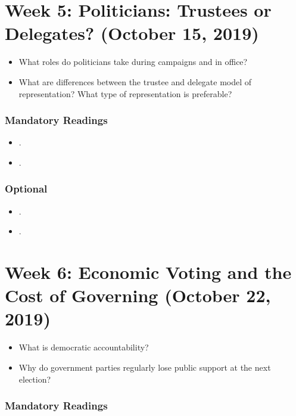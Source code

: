 \documentclass[abstract=on,parskip=full,headings=standardclasses,fontsize=11pt,paper=a4]{scrartcl}
\begin{document}
\section{Week 5: Politicians: Trustees or Delegates? (October 15, 2019)}


\begin{itemize}
\renewcommand\labelitemi{--}
\item What roles do politicians take during campaigns and in office? 
\item What are differences between the trustee and delegate model of representation? What type of representation is preferable?
\end{itemize}


\subsubsection*{Mandatory Readings}
\begin{itemize}
\item {}.
\item {}.
\end{itemize}


\subsubsection*{Optional}
\begin{itemize}
\item {}.
\item {}.
\end{itemize}



\section{Week 6: Economic Voting and the Cost of Governing (October 22, 2019)}


\begin{itemize}
\renewcommand\labelitemi{--}
\item What is democratic accountability?
\item Why do government parties  regularly lose public support at the next election?
\end{itemize}

\subsubsection*{Mandatory Readings}
\end{document}

